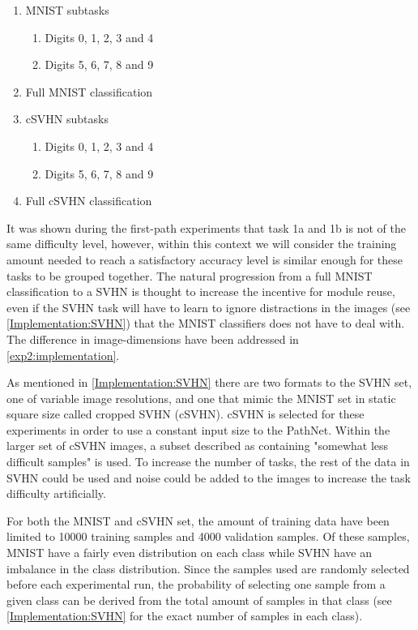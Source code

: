 \begin{enumerate}
    \item MNIST subtasks
    \begin{enumerate}
        \item Digits 0, 1, 2, 3 and 4
        \item Digits 5, 6, 7, 8 and 9 
    \end{enumerate}
    \item Full MNIST classification
    \item cSVHN subtasks
    \begin{enumerate}
        \item Digits 0, 1, 2, 3 and 4
        \item Digits 5, 6, 7, 8 and 9 
    \end{enumerate}
    \item Full cSVHN classification
\end{enumerate}

It was shown during the first-path experiments that task 1a and 1b is not of the same difficulty level, however, within this context we will consider the training amount needed to reach a satisfactory accuracy level is similar enough for these tasks to be grouped together. The natural progression from a full MNIST classification to a SVHN is thought to increase the incentive for module reuse, even if the SVHN task will have to learn to ignore distractions in the images (see \ref{Implementation:SVHN}) that the MNIST classifiers does not have to deal with. The difference in image-dimensions have been addressed in \ref{exp2:implementation}.

As mentioned in \ref{Implementation:SVHN} there are two formats to the SVHN set, one of variable image resolutions, and one that mimic the MNIST set in static square size called cropped SVHN (cSVHN). cSVHN is selected for these experiments in order to use a constant input size to the PathNet. Within the larger set of cSVHN images, a subset described as containing "somewhat less difficult samples" is used. To increase the number of tasks, the rest of the data in SVHN could be used and noise could be added to the images to increase the task difficulty artificially. 

For both the MNIST and cSVHN set, the amount of training data have been limited to 10000 training samples and 4000 validation samples. Of these samples, MNIST have a fairly even distribution on each class while SVHN have an imbalance in the class distribution. Since the samples used are randomly selected before each experimental run, the probability of selecting one sample from a given class can be derived from the total amount of samples in that class (see \ref{Implementation:SVHN} for the exact number of samples in each class).

